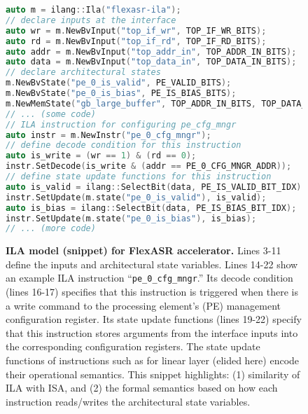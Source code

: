 \begin{figure}[!ht]
  \begin{minipage}[h]{0.31\textwidth}
    \vspace{-3\fboxsep}
    \caption{
    \textbf{ILA model (snippet) for FlexASR accelerator.}
    Lines 3-11 define the inputs and architectural state variables.
    Lines 14-22 show an example ILA instruction 
    ``\texttt{\small pe\_0\_cfg\_mngr}.'' 
    Its decode condition (lines 16-17) specifies that this instruction is triggered when there is a write command to the %
    processing element's (PE) management configuration register.
    Its state update functions (lines 19-22) specify that this instruction stores arguments from the interface inputs into the corresponding configuration registers. The state update functions of instructions such as for linear layer (elided here) %
    encode their operational semantics.
    This snippet highlights:
    (1) similarity of ILA with ISA, and
    (2) the formal semantics based on how each instruction reads/writes the architectural state variables.
    }
    \label{fig.ila-example}
  \end{minipage}\hfill
  \begin{minipage}[h]{0.66\textwidth}
    \begin{lstlisting}[language=c]
auto m = ilang::Ila("flexasr-ila");
// declare inputs at the interface
auto wr = m.NewBvInput("top_if_wr", TOP_IF_WR_BITS);
auto rd = m.NewBvInput("top_if_rd", TOP_IF_RD_BITS);
auto addr = m.NewBvInput("top_addr_in", TOP_ADDR_IN_BITS);
auto data = m.NewBvInput("top_data_in", TOP_DATA_IN_BITS);
// declare architectural states
m.NewBvState("pe_0_is_valid", PE_VALID_BITS);
m.NewBvState("pe_0_is_bias", PE_IS_BIAS_BITS);
m.NewMemState("gb_large_buffer", TOP_ADDR_IN_BITS, TOP_DATA_IN_BITS);
// ... (some code)
// ILA instruction for configuring pe_cfg_mngr
auto instr = m.NewInstr("pe_0_cfg_mngr");
// define decode condition for this instruction
auto is_write = (wr == 1) & (rd == 0);
instr.SetDecode(is_write & (addr == PE_0_CFG_MNGR_ADDR));
// define state update functions for this instruction
auto is_valid = ilang::SelectBit(data, PE_IS_VALID_BIT_IDX);
instr.SetUpdate(m.state("pe_0_is_valid"), is_valid);
auto is_bias = ilang::SelectBit(data, PE_IS_BIAS_BIT_IDX);
instr.SetUpdate(m.state("pe_0_is_bias"), is_bias);
// ... (more code)
    \end{lstlisting}
  \end{minipage}%
\Description{}
\end{figure}